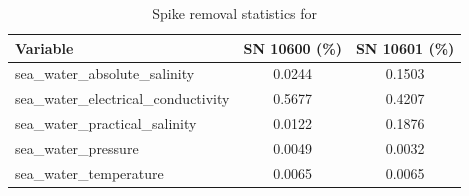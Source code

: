 \begin{table}[h]
\centering
\caption{Spike removal statistics for \projectname{} \casenumber{}}
\label{tab:str14_spike_stats}
\begin{tabular}{|l|c|c|}
\hline
Variable & SN 10600 (\%) & SN 10601 (\%) \\
\hline
sea\_water\_absolute\_salinity & 0.0244 & 0.1503 \\
sea\_water\_electrical\_conductivity & 0.5677 & 0.4207 \\
sea\_water\_practical\_salinity & 0.0122 & 0.1876 \\
sea\_water\_pressure & 0.0049 & 0.0032 \\
sea\_water\_temperature & 0.0065 & 0.0065 \\
\hline
\end{tabular}
\end{table}
